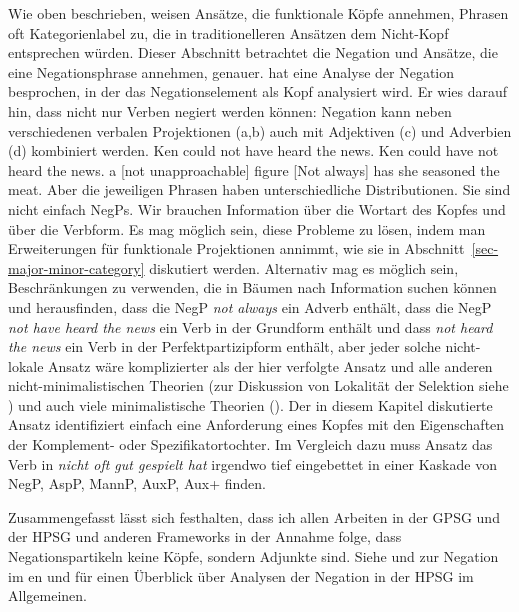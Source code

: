 Wie oben beschrieben, weisen Ansätze, die funktionale Köpfe annehmen, Phrasen oft Kategorienlabel zu,
die in traditionelleren Ansätzen dem Nicht-Kopf entsprechen würden. Dieser Abschnitt betrachtet
die Negation und Ansätze, die eine Negationsphrase annehmen, genauer. \citet{Ernst92a} hat eine Analyse der
Negation besprochen, in der das Negationselement als Kopf analysiert wird. Er wies darauf hin, dass
nicht nur Verben negiert werden können: Negation kann neben verschiedenen verbalen Projektionen
(a,b) auch mit Adjektiven (c) und Adverbien (d) kombiniert werden.
\eal
\ex Ken could not have heard the news.
\ex Ken could have not heard the news.
\ex a [not unapproachable] figure
\ex {}[Not always] has she seasoned the meat.
\zl
Aber die jeweiligen Phrasen haben unterschiedliche Distributionen. Sie sind nicht einfach NegPs. Wir brauchen
Information über die Wortart des Kopfes und über die Verbform. Es mag möglich sein, diese
Probleme zu lösen, indem man Erweiterungen für funktionale Projektionen annimmt, wie sie in
Abschnitt~\ref{sec-major-minor-category} diskutiert werden. Alternativ mag es möglich sein, Beschränkungen zu verwenden, die
in Bäumen nach Information suchen können und herausfinden, dass die NegP \emph{not always} ein Adverb enthält,
dass die NegP \emph{not have heard the news} ein Verb in der Grundform enthält und dass \emph{not
  heard the news} ein Verb in der Perfektpartizipform enthält, aber jeder solche nicht-lokale Ansatz
wäre komplizierter als der hier verfolgte Ansatz und alle anderen nicht-minimalistischen Theorien
(zur Diskussion von Lokalität der Selektion siehe \citealt{Sag2007a}) und auch viele minimalistische Theorien (\zb \citealt[]{Abraham2005a}). Der in diesem Kapitel diskutierte Ansatz identifiziert einfach eine Anforderung
  eines Kopfes mit den Eigenschaften der Komplement- oder Spezifikatortochter. Im Vergleich dazu muss 
  Ansatz das Verb in \emph{nicht oft gut gespielt hat}
  irgendwo tief eingebettet in einer Kaskade von NegP, AspP, MannP, AuxP, Aux+ finden.

Zusammengefasst lässt sich festhalten, dass ich allen Arbeiten in der GPSG und der HPSG und anderen
Frameworks in der Annahme folge, dass Negationspartikeln keine Köpfe, sondern Adjunkte sind. Siehe  und  zur Negation im en und
 für einen Überblick über Analysen der Negation in der HPSG im Allgemeinen.

